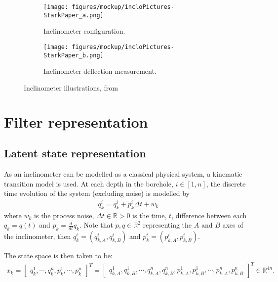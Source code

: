 \documentclass[pamm,a4paper,fleqn]{w-art}
\begin{document}
\begin{figure}[hb!]
  \centering
  \begin{subfigure}{.5\textwidth}
    \centering
    \texttt{[image: figures/mockup/incloPictures-StarkPaper\_a.png]}
    \caption{Inclinometer configuration.}
    \label{fig:inclo_sub1}
  \end{subfigure}%
  \centering
  \begin{subfigure}{.5\textwidth}
    \centering
    \texttt{[image: figures/mockup/incloPictures-StarkPaper\_b.png]}
    \caption{Inclinometer deflection measurement.}
    \label{fig:inclo_sub2}
  \end{subfigure}%
  \caption{Inclinometer illustrations, from \cite{stark2008slope}}
  \label{fig:inclinometer}
\end{figure}



\section{Filter representation}

\subsection{Latent state representation}

As an inclinometer can be modelled as a classical physical system, a kinematic transition model is used. At each depth in the borehole, $i \in [1,n]$, the discrete time evolution of the system (excluding noise) is modelled by
\begin{align}
q^i_k = q^i_k + p^i_k \Delta t + w_k
\end{align}
where $w_k$ is the process noise, $\Delta t \in \mathbb{R} > 0$ is the time, $t$, difference between each $q_k = q(t)$ and $p_k = \frac{d}{dt}q_k$. Note that $p, q \in \mathbb{R}^2$ representing the $A$ and $B$ axes of the inclinometer, then $q^i_k = (q^i_{k,A}, q^i_{k,B})$ and $p^i_k = (p^i_{k,A}, p^i_{k,B})$.

The state space is then taken to be:
\begin{align}
  \label{eqn:statespacemodel}
  x_k = \begin{bmatrix}
    q^1_k, \cdots, q^n_k, 
    p^1_k, \cdots, p^n_k  \end{bmatrix}^T = \begin{bmatrix}
      q^1_{k,A}, q^1_{k,B}, \cdots, q^n_{k,A}, q^n_{k,B},
      p^1_{k,A}, p^1_{k,B}, \cdots, p^n_{k,A}, p^n_{k,B} \end{bmatrix}^T \in \mathbb{R}^{4n}.
\end{align}
\end{document}
